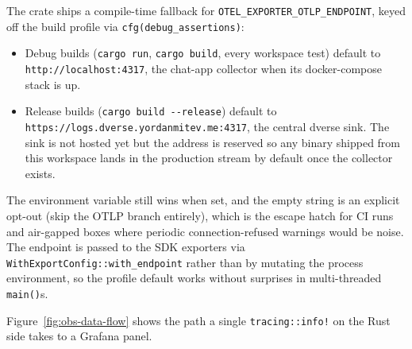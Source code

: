 \documentclass[11pt,a4paper]{article}
\begin{document}
The crate ships a compile-time fallback for
\texttt{OTEL\_EXPORTER\_OTLP\_ENDPOINT}, keyed off the build
profile via \texttt{cfg(debug\_assertions)}:

\begin{itemize}
  \item Debug builds (\texttt{cargo run},
        \texttt{cargo build}, every workspace test) default to
        \texttt{http://localhost:4317}, the chat-app collector
        when its docker-compose stack is up.
  \item Release builds (\texttt{cargo build -{}-release})
        default to
        \texttt{https://logs.\allowbreak dverse.\allowbreak yordanmitev.\allowbreak me:4317},
        the central dverse sink. The sink is not hosted yet but
        the address is reserved so any binary shipped from this
        workspace lands in the production stream by default once
        the collector exists.
\end{itemize}

The environment variable still wins when set, and the empty
string is an explicit opt-out (skip the OTLP branch entirely),
which is the escape hatch for CI runs and air-gapped boxes
where periodic connection-refused warnings would be noise. The
endpoint is passed to the SDK exporters via
\texttt{WithExportConfig::with\_endpoint} rather than by
mutating the process environment, so the profile default works
without surprises in multi-threaded \texttt{main()}s.

Figure~\ref{fig:obs-data-flow} shows the path a single
\texttt{tracing::info!} on the Rust side takes to a Grafana
panel.
\end{document}
